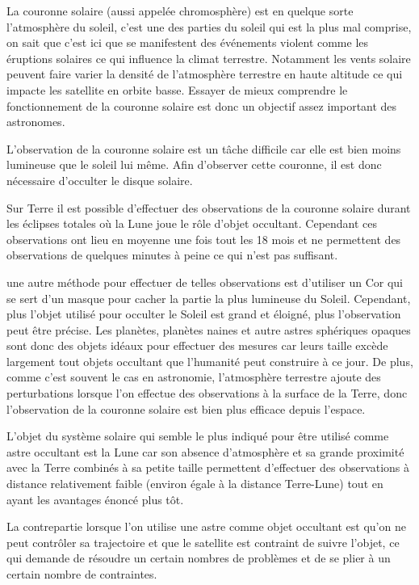 \documentclass[11pt]{article} %
\begin{document}
		La couronne solaire (aussi appelée chromosphère) est en quelque sorte l'atmosphère du soleil, c'est une des parties du soleil qui est la plus mal comprise, on sait que c'est ici que se manifestent des événements violent comme les éruptions solaires ce qui influence la climat terrestre. Notamment les vents solaire peuvent faire varier la densité de l'atmosphère terrestre en haute altitude ce qui impacte les satellite en orbite basse. Essayer de mieux comprendre le fonctionnement de la couronne solaire est donc un objectif assez important des astronomes.
		
		L'observation de la couronne solaire est un tâche difficile car elle est bien moins lumineuse que le soleil lui même. Afin d'observer cette couronne, il est donc nécessaire d'occulter le disque solaire.
		
		Sur Terre il est possible d'effectuer des observations de la couronne solaire durant les éclipses totales où la Lune joue le rôle d'objet occultant. Cependant ces observations ont lieu en moyenne une fois tout les 18 mois et ne permettent des observations de quelques minutes à peine ce qui n'est pas suffisant.
		
		une autre méthode pour effectuer de telles observations est d'utiliser un \gls{Cor} qui se sert d'un masque pour cacher la partie la plus lumineuse du Soleil. Cependant, plus l'objet utilisé pour occulter le Soleil est grand et éloigné, plus l'observation peut être précise. Les planètes, planètes naines et autre astres sphériques opaques sont donc des objets idéaux pour effectuer des mesures car leurs taille excède largement tout objets occultant que l'humanité peut construire à ce jour. De plus, comme c'est souvent le cas en astronomie, l'atmosphère terrestre ajoute des perturbations lorsque l'on effectue des observations à la surface de la Terre, donc l'observation de la couronne solaire est bien plus efficace depuis l'espace.
		
		L'objet du système solaire qui semble le plus indiqué pour être utilisé comme astre occultant est la Lune car son absence d'atmosphère et sa grande proximité avec la Terre combinés à sa petite taille permettent d'effectuer des observations à distance relativement faible (environ égale à la distance Terre-Lune) tout en ayant les avantages énoncé plus tôt.
		 
		La contrepartie lorsque l'on utilise une astre comme objet occultant est qu'on ne peut contrôler sa trajectoire et que le satellite est contraint de suivre l'objet, ce qui demande de résoudre un certain nombres de problèmes et de se plier à un certain nombre de contraintes.
		
\end{document}
